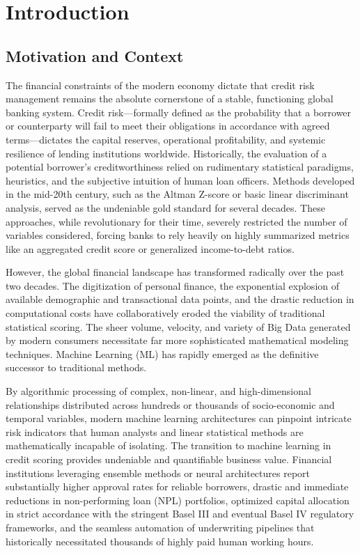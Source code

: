 \hypertarget{introduction}{%
\chapter{Introduction}\label{introduction}}

\hypertarget{motivation-and-context}{%
\section{Motivation and Context}\label{motivation-and-context}}

The financial constraints of the modern economy dictate that credit risk
management remains the absolute cornerstone of a stable, functioning
global banking system. Credit risk---formally defined as the probability
that a borrower or counterparty will fail to meet their obligations in
accordance with agreed terms---dictates the capital reserves,
operational profitability, and systemic resilience of lending
institutions worldwide. Historically, the evaluation of a potential
borrower's creditworthiness relied on rudimentary statistical paradigms,
heuristics, and the subjective intuition of human loan officers. Methods
developed in the mid-20th century, such as the Altman Z-score or basic
linear discriminant analysis, served as the undeniable gold standard for
several decades. These approaches, while revolutionary for their time,
severely restricted the number of variables considered, forcing banks to
rely heavily on highly summarized metrics like an aggregated credit
score or generalized income-to-debt ratios.

However, the global financial landscape has transformed radically over
the past two decades. The digitization of personal finance, the
exponential explosion of available demographic and transactional data
points, and the drastic reduction in computational costs have
collaboratively eroded the viability of traditional statistical scoring.
The sheer volume, velocity, and variety of Big Data generated by modern
consumers necessitate far more sophisticated mathematical modeling
techniques. Machine Learning (ML) has rapidly emerged as the definitive
successor to traditional methods.

By algorithmic processing of complex, non-linear, and high-dimensional
relationships distributed across hundreds or thousands of socio-economic
and temporal variables, modern machine learning architectures can
pinpoint intricate risk indicators that human analysts and linear
statistical methods are mathematically incapable of isolating. The
transition to machine learning in credit scoring provides undeniable and
quantifiable business value. Financial institutions leveraging ensemble
methods or neural architectures report substantially higher approval
rates for reliable borrowers, drastic and immediate reductions in
non-performing loan (NPL) portfolios, optimized capital allocation in
strict accordance with the stringent Basel III and eventual Basel IV
regulatory frameworks, and the seamless automation of underwriting
pipelines that historically necessitated thousands of highly paid human
working hours.

